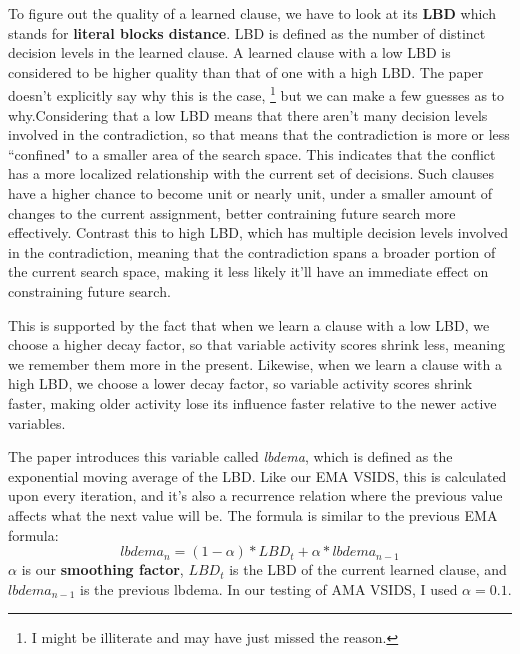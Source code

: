 \documentclass[oneside]{book}
\begin{document}
To figure out the quality of a learned clause, we have to look at its \textbf{LBD}
which stands for \textbf{literal blocks distance}. LBD is defined as the number of 
distinct decision levels in the learned clause. A learned clause with a low LBD is considered to be higher 
quality than that of one with a high LBD. The paper doesn't explicitly say why this is the case,
\footnote{I might be illiterate and may have just missed the reason.}
but we can make a few guesses as to why.Considering that a low LBD means that there aren't 
many decision levels involved in the contradiction, so that means that the contradiction 
is more or less ``confined" to a smaller area of the search space. This indicates that 
the conflict has a more localized relationship with the current set of decisions. 
Such clauses have a higher chance to become unit or nearly unit, under a smaller 
amount of changes to the current assignment, better contraining future search more effectively.
Contrast this to high LBD, which has multiple decision levels involved in the contradiction, 
meaning that the contradiction spans a broader portion of the current search space, making 
it less likely it'll have an immediate effect on constraining future search.

This is supported by the fact that when we learn a clause with a low LBD, we choose a 
higher decay factor, so that variable activity scores shrink less, meaning we remember 
them more in the present. Likewise, when we learn a clause with a high LBD, we choose 
a lower decay factor, so variable activity scores shrink faster, making older activity 
lose its influence faster relative to the newer active variables.

The paper introduces this variable called \textit{lbdema}, which is defined as the 
exponential moving average of the LBD. Like our EMA VSIDS, this is calculated 
upon every iteration, and it's also a recurrence relation where the previous value affects 
what the next value will be. The formula is similar to the previous EMA formula:
$${lbdema}_n = (1 - \alpha) * {LBD}_t + \alpha * {lbdema}_{n - 1}$$
$\alpha$ is our \textbf{smoothing factor}, ${LBD}_t$ is the LBD of the current learned clause,
and \\${lbdema}_{n - 1}$ is the previous lbdema. In our testing of AMA VSIDS, I used 
$\alpha = 0.1$. 
\end{document}
